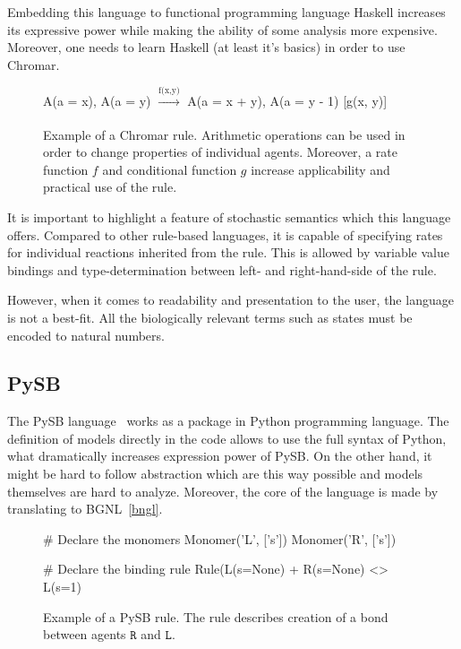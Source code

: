 \documentclass[12pt]{fithesis2}
\begin{document}
Embedding this language to functional programming language Haskell increases its expressive power while making the ability of some analysis more expensive. Moreover, one needs to learn Haskell (at least it's basics) in order to use Chromar.

\begin{figure}[!h]
\begin{center}
A(a = x), A(a = y) $\xrightarrow[]{\text{f(x,y)}}$ A(a = x + y), A(a = y - 1) [g(x, y)]
\end{center}
\caption{Example of a Chromar rule. Arithmetic operations can be used in order to change properties of individual agents. Moreover, a rate function $f$ and conditional function $g$ increase applicability and practical use of the rule.}\label{chromar-rule}
\end{figure}

It is important to highlight a feature of stochastic semantics which this language offers. Compared to other rule-based languages, it is capable of specifying rates for individual reactions inherited from the rule. This is allowed by variable value bindings and type-determination between left- and right-hand-side of the rule.

However, when it comes to readability and presentation to the user, the language is not a best-fit. All the biologically relevant terms such as states must be encoded to natural numbers.

\subsection{PySB}

The PySB language~\cite{Lopez646} works as a package in Python programming language. The definition of models directly in the code allows to use the full syntax of Python, what dramatically increases expression power of PySB. On the other hand, it might be hard to follow abstraction which are this way possible and models themselves are hard to analyze. Moreover, the core of the language is made by translating to BGNL~\ref{bngl}.

\begin{figure}[!h]
\begin{center}
\begin{python}
# Declare the monomers
Monomer('L', ['s'])
Monomer('R', ['s'])

# Declare the binding rule
Rule(L(s=None) + R(s=None) <> L(s=1) %
\end{python}
\end{center}
\caption{Example of a PySB rule. The rule describes creation of a bond between agents $\mathtt{R}$ and $\mathtt{L}$.}\label{PySB-rule}
\end{figure}
\end{document}
